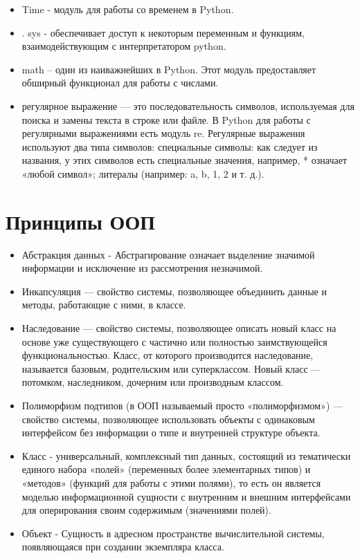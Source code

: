\begin{itemize}
		\item Time - модуль для работы со временем в Python.
		\item. sys - обеспечивает доступ к некоторым переменным и функциям, взаимодействующим с интерпретатором python.
		\item math – один из наиважнейших в Python. Этот модуль предоставляет обширный функционал для работы с числами.
		\item регулярное выражение — это последовательность символов, используемая для поиска и замены текста в строке или файле. В Python для работы с регулярными выражениями есть модуль re. Регулярные выражения используют два типа символов: специальные символы: как следует из названия, у этих символов есть специальные значения, например, * означает «любой символ»; литералы (например: a, b, 1, 2 и т. д.).
	\end{itemize}

\section{Принципы ООП}

\begin{itemize}
\item Абстракция данных - Абстрагирование означает выделение значимой информации и исключение из рассмотрения незначимой. 
\item Инкапсуляция — свойство системы, позволяющее объединить данные и методы, работающие с ними, в классе.
\item Наследование — свойство системы, позволяющее описать новый класс на основе уже существующего с частично или полностью заимствующейся функциональностью. Класс, от которого производится наследование, называется базовым, родительским или суперклассом. Новый класс — потомком, наследником, дочерним или производным классом.
\item Полиморфизм подтипов (в ООП называемый просто «полиморфизмом») — свойство системы, позволяющее использовать объекты с одинаковым интерфейсом без информации о типе и внутренней структуре объекта.
\item Класс - универсальный, комплексный тип данных, состоящий из тематически единого набора «полей» (переменных более элементарных типов) и «методов» (функций для работы с этими полями), то есть он является моделью информационной сущности с внутренним и внешним интерфейсами для оперирования своим содержимым (значениями полей). 
\item Объект - Сущность в адресном пространстве вычислительной системы, появляющаяся при создании экземпляра класса.
\end{itemize}

